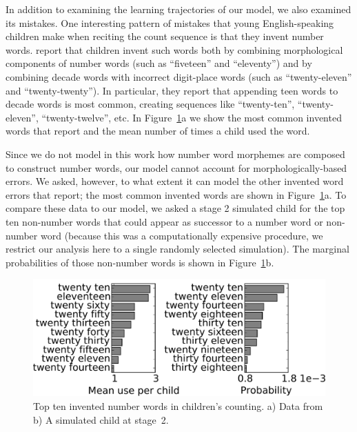 \documentclass[10pt,letterpaper]{article}
\begin{document}
In addition to examining the learning trajectories of our model, we
also examined its mistakes. One interesting pattern of mistakes that
young English-speaking children make when reciting the count sequence
is that they invent number words. \citeauthor{FusRicBriar1982} report
that children invent such words both by combining morphological
components of number words (such as ``fiveteen'' and ``eleventy'') and
by combining decade words with incorrect digit-place words (such as
``twenty-eleven'' and ``twenty-twenty''). In particular, they report
that appending teen words to decade words is most common, creating
sequences like ``twenty-ten'', ``twenty-eleven'', ``twenty-twelve'',
etc. In Figure~\ref{fig:inventedWordComparison}a we show the most
common invented words that \citeauthor{FusRicBriar1982} report and the
mean number of times a child used the word.

Since we do not model in this work how number word morphemes are
composed to construct number words, our model cannot account for
morphologically-based errors. We asked, however, to what extent it can
model the other invented word errors that \citeauthor{FusRicBriar1982}
report; the most common invented words are shown in
Figure~\ref{fig:inventedWordComparison}a. To compare these data to
our model, we asked a stage 2 simulated child for the top ten
non-number words that could appear as successor to a number word or
non-number word (because this was a computationally expensive
procedure, we restrict our analysis here to a single randomly selected
simulation). The marginal probabilities of those non-number words is
shown in Figure~\ref{fig:inventedWordComparison}b.

\begin{figure}[t]
\includegraphics[width=0.9\linewidth]{figures/inventedWordComparison3}
\caption{Top ten invented number words in children's counting. a) Data
  from \citeauthor{FusRicBriar1982} b) A simulated child at stage~2.
   \label{fig:inventedWordComparison}}
\end{figure}
\end{document}
